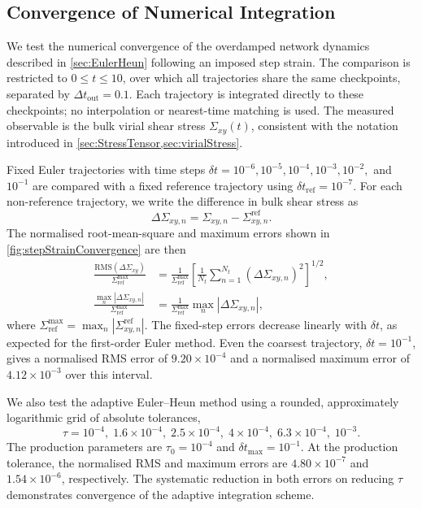 \begin{subappendices}
\section{Convergence of Numerical Integration}
\label{app:stepStrainConvergence}

We test the numerical convergence of the overdamped network dynamics described in \cref{sec:EulerHeun} following an imposed step strain. The comparison is restricted to $0\leq t\leq10$, over which all trajectories share the same checkpoints, separated by $\Delta t_{\mathrm{out}}=0.1$. Each trajectory is integrated directly to these checkpoints; no interpolation or nearest-time matching is used. The measured observable is the bulk virial shear stress $\Sigma_{xy}(t)$, consistent with the notation introduced in \cref{sec:StressTensor,sec:virialStress}.

Fixed Euler trajectories with time steps $\delta t=10^{-6},10^{-5},10^{-4},10^{-3},10^{-2},$ and $10^{-1}$ are compared with a fixed reference trajectory using $\delta t_{\mathrm{ref}}=10^{-7}$. For each non-reference trajectory, we write the difference in bulk shear stress as
\begin{equation}
    \Delta\Sigma_{xy,n}=\Sigma_{xy,n}-\Sigma_{xy,n}^{\mathrm{ref}}.
\end{equation}
The normalised root-mean-square and maximum errors shown in \cref{fig:stepStrainConvergence} are then
\begin{align}
 \frac{\mathrm{RMS}(\Delta\Sigma_{xy})}{\Sigma_{\mathrm{ref}}^{\max}}
 &= \frac{1}{\Sigma_{\mathrm{ref}}^{\max}}
 \left[\frac{1}{N_t}\sum_{n=1}^{N_t}
 \left(\Delta\Sigma_{xy,n}\right)^2\right]^{1/2},\\
 \frac{\max_n|\Delta\Sigma_{xy,n}|}{\Sigma_{\mathrm{ref}}^{\max}}
 &= \frac{1}{\Sigma_{\mathrm{ref}}^{\max}}
 \max_n\left|\Delta\Sigma_{xy,n}\right|,
\end{align}
where
$\Sigma_{\mathrm{ref}}^{\max}=\max_n|\Sigma_{xy,n}^{\mathrm{ref}}|$. The fixed-step errors decrease linearly with $\delta t$, as expected for the first-order Euler method. Even the coarsest trajectory, $\delta t=10^{-1}$, gives a normalised RMS error of $9.20\times10^{-4}$ and a normalised maximum error of $4.12\times10^{-3}$ over this interval.

We also test the adaptive Euler--Heun method using a rounded, approximately logarithmic grid of absolute tolerances,
\begin{equation}
    \tau=10^{-4},\;1.6\times10^{-4},\;2.5\times10^{-4},\;
    4\times10^{-4},\;6.3\times10^{-4},\;10^{-3}.
\end{equation}
The production parameters are $\tau_0=10^{-4}$ and $\delta t_{\max}=10^{-1}$. At the production tolerance, the normalised RMS and maximum errors are $4.80\times10^{-7}$ and $1.54\times10^{-6}$, respectively. The systematic reduction in both errors on reducing $\tau$ demonstrates convergence of the adaptive integration scheme.


\end{subappendices}
